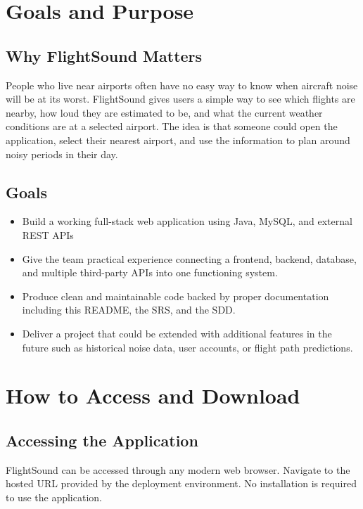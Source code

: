 \documentclass[12pt]{article}
\begin{document}
\newpage

\section{Goals and Purpose}

\subsection{Why FlightSound Matters}
People who live near airports often have no easy way to know when aircraft noise will be at its worst. FlightSound gives users a simple way to see which flights are nearby, how loud they are estimated to be, and what the current weather conditions are at a selected airport. The idea is that someone could open the application, select their nearest airport, and use the information to plan around noisy periods in their day.

\subsection{Goals}
\begin{itemize}
\item Build a working full-stack web application using Java, MySQL, and external REST APIs
\item Give the team practical experience connecting a frontend, backend, database, and multiple third-party APIs into one functioning system.
\item Produce clean and maintainable code backed by proper documentation including this README, the SRS, and the SDD.
\item Deliver a project that could be extended with additional features in the future such as historical noise data, user accounts, or flight path predictions.
\end{itemize}

\newpage

\section{How to Access and Download}

\subsection{Accessing the Application}
FlightSound can be accessed through any modern web browser. Navigate to the hosted URL provided by the deployment environment. No installation is required to use the application.
\end{document}
